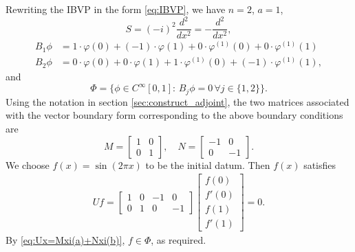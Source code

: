 \documentclass[11pt, oneside, a4paper]{article}
\begin{document}
Rewriting the IBVP in the form \eqref{eq:IBVP}, we have $n=2$, $a=1$,
\[S= (-i)^2 \frac{d^2}{dx^2} = -\frac{d^2}{dx^2},\]
\begin{align*}
B_1\phi &= 1\cdot \varphi(0) + (-1)\cdot \varphi(1) + 0\cdot \varphi^{(1)}(0) + 0\cdot \varphi^{(1)}(1)\\
B_2\phi &= 0\cdot \varphi(0) + 0\cdot \varphi(1) + 1\cdot \varphi^{(1)}(0) + (-1)\cdot \varphi^{(1)}(1),
\end{align*}
and
\[\Phi = \{\phi\in C^{\infty}[0,1]:\, B_j\phi = 0\,\forall j\in\{1,2\}\}.\]
Using the notation in section \ref{sec:construct_adjoint}, the two matrices associated with the vector boundary form corresponding to the above boundary conditions are
$$M = \begin{bmatrix}1&0\\0&1\end{bmatrix},\quad N = \begin{bmatrix}-1&0\\0& -1 \end{bmatrix}.$$
We choose $f(x)=\sin(2\pi x)$ to be the initial datum. Then $f(x)$ satisfies
\begin{align*}
Uf = \begin{bmatrix}
1&0& -1 &0\\
0&1&0& -1
\end{bmatrix} \begin{bmatrix}f(0)\\f'(0)\\f(1)\\f'(1)\end{bmatrix} = 0.
\end{align*}
By \eqref{eq:Ux=Mxi(a)+Nxi(b)}, $f\in \Phi$, as required.
\end{document}
